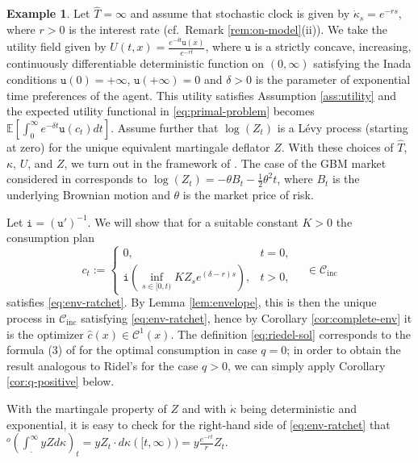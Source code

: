 \documentclass[11pt, oneside]{article}   	%
\theoremstyle{plain}
\theoremstyle{definition}
\newtheorem{exmp}[thm]{Example}
\theoremstyle{remark}
\begin{document}
\begin{exmp}
Let $\hat{T}=\infty$ and assume that stochastic clock is given by $\dot\kappa_s=e^{-rs}$, where $r>0$ is the interest rate (cf.~Remark \ref{rem:on-model}(ii)). We take the utility field given by $U(t,x)=\frac{e^{-\delta t} \mathtt{u}(x)}{e^{-rt}}$, where $\mathtt{u}$ is a strictly concave, increasing, continuously differentiable deterministic function on $(0,\infty)$ satisfying the Inada conditions $\mathtt{u}(0)=+\infty$, $\mathtt{u}(+\infty)=0$ and $\delta>0$ is the parameter of exponential time preferences of the agent. This utility satisfies Assumption \ref{ass:utility} and the expected utility functional in \eqref{eq:primal-problem} becomes
$\mathbb{E}\left[\int_0^\infty e^{-\delta t} \mathtt{u}(c_t)dt\right]$. Assume further that $\log(Z_t)$ is a L\'evy process (starting at zero) for the unique equivalent martingale deflator $Z$. With these choices of $\hat{T}$, $\kappa$, $U$, and $Z$, we turn out in the framework of \cite{riedel}. The case of the GBM market considered in \cite{dybvig} corresponds to $\log(Z_t)=-\theta B_t-\frac{1}{2}\theta^2 t$, where $B_t$ is the underlying Brownian motion and $\theta$ is the market price of risk.

Let $\mathtt{i}=(\mathtt{u}')^{-1}$. We will show that for a suitable constant $K>0$ the consumption plan
\begin{equation}\label{eq:riedel-sol}
c_t:=\begin{cases}0,& t=0,\\ \mathtt{i}\left(\inf_{s\in[0,t)}KZ_se^{(\delta-r)s}\right),& t>0,\end{cases}\quad\in\mathcal{C}_\text{inc}\end{equation}
satisfies \eqref{eq:env-ratchet}. By Lemma \ref{lem:envelope}, this is then the unique process in $\mathcal{C}_\text{inc}$ satisfying \eqref{eq:env-ratchet}, hence by Corollary \ref{cor:complete-env} it is the optimizer $\hat{c}(x)\in\mathcal{C}^1(x)$. The definition \eqref{eq:riedel-sol} corresponds to the formula (3) of \cite{riedel} for the optimal consumption in case $q=0$; in order to obtain the result analogous to Ridel's for the case $q>0$, we can simply apply Corollary \ref{cor:q-positive} below.

With the martingale property of $Z$ and with $\dot\kappa$ being deterministic and exponential, it is easy to check for the right-hand side of \eqref{eq:env-ratchet} that
${}^o\left(\int_.^\infty yZ d\kappa\right)_t=yZ_t\cdot d\kappa([t,\infty))=y\frac{e^{-rt}}{r}Z_t$.


\end{exmp}
\end{document}

